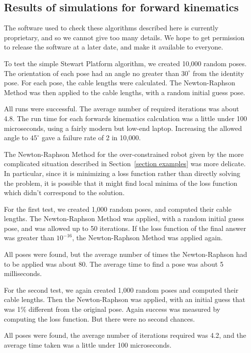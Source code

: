 \documentclass[reqno,12pt]{amsart}
\begin{document}
\subsection{Results of simulations for forward kinematics}

The software used to check these algorithms described here is currently proprietary, and so we cannot give too many details.  We hope to get permission to release the software at a later date, and make it available to everyone.

To test the simple Stewart Platform algorithm, we created 10,000 random poses.  The orientation of each pose had an angle no greater than $30^\circ$ from the identity pose.  For each pose, the cable lengths were calculated.  The Newton-Raphson Method was then applied to the cable lengths, with a random initial guess pose.

All runs were successful.  The average number of required iterations was about 4.8.  The run time for each forwards kinematics calculation was a little under 100 microseconds, using a fairly modern but low-end laptop.  Increasing the allowed angle to $45^\circ$ gave a failure rate of 2 in 10,000.

The Newton-Raphson Method for the over-constrained robot given by the more complicated situation described in Section~\ref{section examples} was more delicate.  In particular, since it is minimizing a loss function rather than directly solving the problem, it is possible that it might find local minima of the loss function which didn't correspond to the solution.

For the first test, we created 1,000 random poses, and computed their cable lengths.  The Newton-Raphson Method was applied, with a random initial guess pose, and was allowed up to 50 iterations.  If the loss function of the final answer was greater than $10^{-16}$, the Newton-Raphson Method was applied again.

All poses were found, but the average number of times the Newton-Raphson had to be applied was about 80.  The average time to find a pose was about 5 milliseconds.

For the second test, we again created 1,000 random poses and computed their cable lengths.  Then the Newton-Raphson was applied, with an initial guess that was 1\% different from the original pose.  Again success was measured by computing the loss function.  But there were no second chances.

All poses were found, the average number of iterations required was 4.2, and the average time taken was a little under 100 microseconds.
\end{document}
